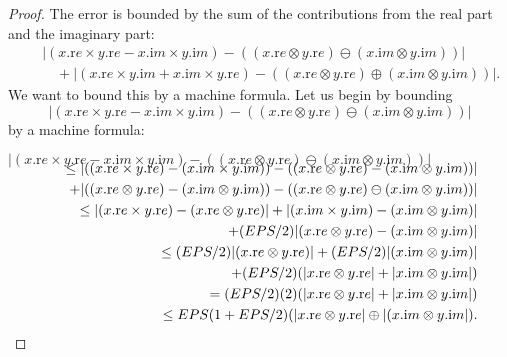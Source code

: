 \begin{proof}{}
The error is bounded by the sum of the contributions from the real part and the imaginary part:
\begin{eqnarray*}
&&|(x.{\mathrm re} \times  y.{\mathrm re} - x.{\mathrm im} \times y.{\mathrm im}) - ((x.{\mathrm re} \otimes y.{\mathrm re}) \ominus
(x.{\mathrm im}
\otimes y.{\mathrm im}))| \\[6pt]
&&\quad + |(x.{\mathrm re} \times  y.{\mathrm im} + x.{\mathrm im} \times y.{\mathrm re}) - ((x.{\mathrm re} \otimes y.{\mathrm re}) \oplus (x.{\mathrm im}
\otimes y.{\mathrm im}))|.
\end{eqnarray*}
   We want to bound this by a machine formula.  Let us begin by bounding 
$$|(x.{\mathrm re} \times  y.{\mathrm re} - x.{\mathrm im} \times y.{\mathrm im}) - ((x.{\mathrm re} \otimes y.{\mathrm re}) \ominus (x.{\mathrm im}
 \otimes y.{\mathrm im}))| $$ 
by a machine formula:

\centerline{
${\displaystyle |(x.{\mathrm re} \times  y.{\mathrm re} - x.{\mathrm im} \times y.{\mathrm im}) - ((x.{\mathrm re} \otimes y.{\mathrm re}) \ominus
(x.{\mathrm im}
\otimes y.{\mathrm im}))| }$}
\begin{eqnarray*}
\noalign{\vskip-16pt}
&&\le |((x.{\mathrm re} \times  y.{\mathrm re}) - (x.{\mathrm im} \times y.{\mathrm im})) - ((x.{\mathrm re} \otimes y.{\mathrm re}) -
(x.{\mathrm im}
\otimes y.{\mathrm im}))|\\
&&\quad + |((x.{\mathrm re} \otimes y.{\mathrm re}) - (x.{\mathrm im} \otimes y.{\mathrm im}))-((x.{\mathrm re} \otimes y.{\mathrm re})
\ominus (x.{\mathrm im} \otimes y.{\mathrm im}))| \\
&&\le |(x.{\mathrm re} \times  y.{\mathrm re}) - (x.{\mathrm re} \otimes y.{\mathrm re})| + |(x.{\mathrm
im} \times y.{\mathrm im})- (x.{\mathrm im} \otimes y.{\mathrm im})| \\
&&\quad + (EPS/2)|(x.{\mathrm re} \otimes y.{\mathrm re}) - (x.{\mathrm im} \otimes
y.{\mathrm im})|\\
&&\le (EPS/2)|(x.{\mathrm re} \otimes y.{\mathrm re})| + (EPS/2)|(x.{\mathrm im} \otimes y.{\mathrm im})| \\
&&\quad + (EPS/2)(|x.{\mathrm re} \otimes
y.{\mathrm re}| + |x.{\mathrm im} \otimes y.{\mathrm im}|)\\
&&= (EPS/2)(2) (|x.{\mathrm re} \otimes y.{\mathrm re}| + |x.{\mathrm im} \otimes y.{\mathrm
im}|)\\
&&\le EPS (1 + EPS/2) (|x.{\mathrm re} \otimes y.{\mathrm re}| \oplus |(x.{\mathrm im} \otimes y.{\mathrm im}|) .
\end{eqnarray*}



\end{proof}
